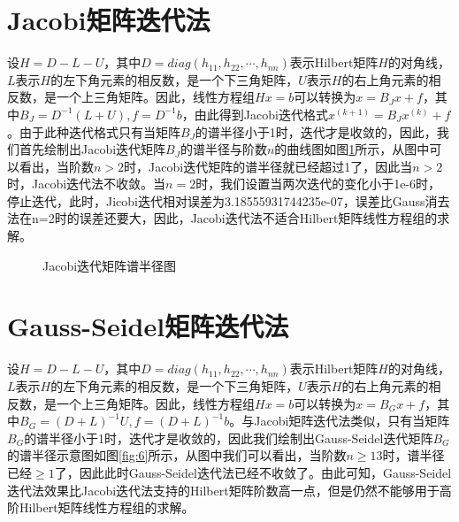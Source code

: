 \documentclass[a4paper]{article}
\begin{document}
\section{Jacobi矩阵迭代法}
设$H=D-L-U$，其中$D=diag(h_{11},h_{22},\cdots,h_{nn})$表示Hilbert矩阵$H$的对角线，$L$表示$H$的左下角元素的相反数，是一个下三角矩阵，$U$表示$H$的右上角元素的相反数，是一个上三角矩阵。因此，线性方程组$Hx=b$可以转换为$x=B_Jx+f$，其中$B_J=D^{-1}(L+U),f=D^{-1}b$，由此得到Jacobi迭代格式$x^{(k+1)}=B_Jx^{(k)}+f$。由于此种迭代格式只有当矩阵$B_J$的谱半径小于1时，迭代才是收敛的，因此，我们首先绘制出Jacobi迭代矩阵$B_J$的谱半径与阶数$n$的曲线图如图\ref{fig:5}所示，从图中可以看出，当阶数$n>2$时，Jacobi迭代矩阵的谱半径就已经超过1了，因此当$n>2$时，Jacobi迭代法不收敛。当$n=2$时，我们设置当两次迭代的变化小于1e-6时，停止迭代，此时，Jicobi迭代相对误差为3.18555931744235e-07，误差比Gauss消去法在n=2时的误差还要大，因此，Jacobi迭代法不适合Hilbert矩阵线性方程组的求解。

\begin{figure}[!h] \centering 
	\caption{Jacobi迭代矩阵谱半径图} 
	\label{fig:5} 
\end{figure}

\section{Gauss-Seidel矩阵迭代法}
设$H=D-L-U$，其中$D=diag(h_{11},h_{22},\cdots,h_{nn})$表示Hilbert矩阵$H$的对角线，$L$表示$H$的左下角元素的相反数，是一个下三角矩阵，$U$表示$H$的右上角元素的相反数，是一个上三角矩阵。因此，线性方程组$Hx=b$可以转换为$x=B_Gx+f$，其中$B_G=(D+L)^{-1}U,f=(D+L)^{-1}b$。与Jacobi矩阵迭代法类似，只有当矩阵$B_G$的谱半径小于1时，迭代才是收敛的，因此我们绘制出Gauss-Seidel迭代矩阵$B_G$的谱半径示意图如图\ref{fig:6}所示，从图中我们可以看出，当阶数$n\ge 13$时，谱半径已经$\ge 1$了，因此此时Gauss-Seidel迭代法已经不收敛了。由此可知，Gauss-Seidel迭代法效果比Jacobi迭代法支持的Hilbert矩阵阶数高一点，但是仍然不能够用于高阶Hilbert矩阵线性方程组的求解。
\end{document}
